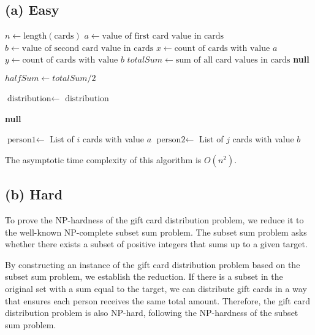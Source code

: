 \documentclass[10pt]{article}
\begin{document}
\subsection*{(a) Easy}

\begin{algorithmic}
  \State $n \gets \text{length}(\text{cards})$
  \State $a \gets \text{value of first card value in }\text{cards}$
  \State $b \gets \text{value of second card value in }\text{cards}$
  \State $x \gets \text{count of cards with value } a$
  \State $y \gets \text{count of cards with value } b$
  \State $totalSum \gets \text{sum of all card values in }\text{cards}$
  \State \Return \textbf{null} 
  \EndIf

  \State $halfSum \gets totalSum / 2$

  \State $\text{distribution} \gets$ 
  \State \Return $\text{distribution}$
  \EndIf
  \EndFor
  \EndFor

  \State \Return \textbf{null} 
  \EndFunction

  \State $\text{person1} \gets$ List of $i$ cards with value $a$
  \State $\text{person2} \gets$ List of $j$ cards with value $b$
  \State {}
  \EndFunction
\end{algorithmic}

The asymptotic time complexity of this algorithm is $O(n^2)$.

\subsection*{(b) Hard}

To prove the NP-hardness of the gift card distribution problem, we reduce it to the well-known NP-complete subset sum problem. The subset sum problem asks whether there exists a subset of positive integers that sums up to a given target.

By constructing an instance of the gift card distribution problem based on the subset sum problem, we establish the reduction. If there is a subset in the original set with a sum equal to the target, we can distribute gift cards in a way that ensures each person receives the same total amount. Therefore, the gift card distribution problem is also NP-hard, following the NP-hardness of the subset sum problem.
\end{document}
